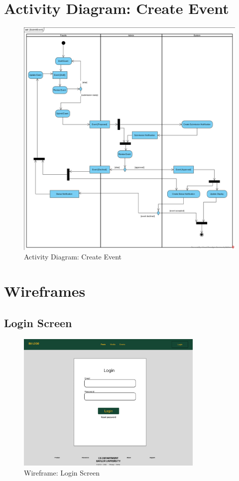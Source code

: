 \documentclass{article}
\begin{document}
\section{Activity Diagram: Create Event}
\begin{figure}[H]
    \centering
    \includegraphics[width=.98\textwidth]{images/SubmitEvent.png}
    \centering
    \caption{Activity Diagram: Create Event}
    \label{fig:activityDiagram}
\end{figure}
\section{Wireframes}
\subsection{Login Screen}
\begin{figure}[H]
    \centering
    \includegraphics[width=0.8\textwidth]{images/wireframe_login.png}
    \centering
    \caption{Wireframe: Login Screen}
\end{figure}
\end{document}
